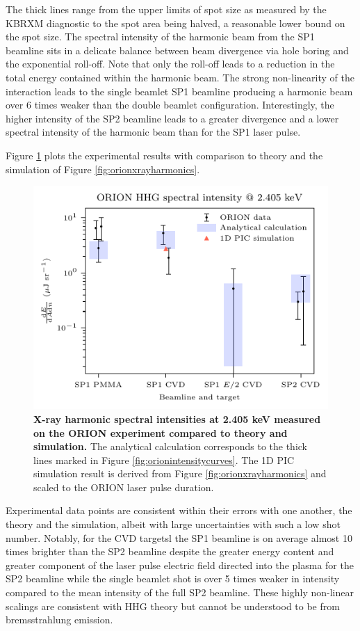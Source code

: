 The thick lines range from the upper limits of spot size as measured by the KBRXM diagnostic to the spot area being halved, a reasonable lower bound on the spot size. The spectral intensity of the harmonic beam from the SP1 beamline sits in a delicate balance between beam divergence via hole boring and the exponential roll-off. Note that only the roll-off leads to a reduction in the total energy contained within the harmonic beam. The strong non-linearity of the interaction leads to the single beamlet SP1 beamline producing a harmonic beam over 6 times weaker than the double beamlet configuration. Interestingly, the higher intensity of the SP2 beamline leads to a greater divergence and a lower spectral intensity of the harmonic beam than for the SP1 laser pulse.

Figure \ref{fig:orionexperimentresults} plots the experimental results with comparison to theory and the simulation of Figure \ref{fig:orionxrayharmonics}. 
\begin{figure}
	\centering
	\includegraphics{figures/orion/orion_experiment_results}
	\caption[X-ray harmonic intensities measured on the ORION experiment compared to theory and simulation.]{\textbf{X-ray harmonic spectral intensities at 2.405 keV measured on the ORION experiment compared to theory and simulation.} The analytical calculation corresponds to the thick lines marked in Figure \ref{fig:orionintensitycurves}. The 1D PIC simulation result is derived from Figure \ref{fig:orionxrayharmonics} and scaled to the ORION laser pulse duration.}
	\label{fig:orionexperimentresults}
\end{figure}
Experimental data points are consistent within their errors with one another, the theory and the simulation, albeit with large uncertainties with such a low shot number. Notably, for the CVD targetsl the SP1 beamline is on average almost 10 times brighter than the SP2 beamline despite the greater energy content and greater component of the laser pulse electric field directed into the plasma for the SP2 beamline while the single beamlet shot is over 5 times weaker in intensity compared to the mean intensity of the full SP2 beamline. These highly non-linear scalings are consistent with HHG theory but cannot be understood to be from bremsstrahlung emission. 

